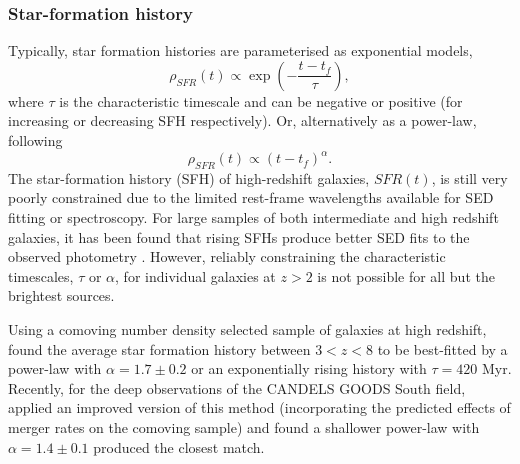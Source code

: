 \subsubsection{Star-formation history}
Typically, star formation histories are parameterised as exponential models,
\begin{equation}
    \rho_{SFR}(t) \propto \exp(-\frac{t - t_{f}}{\tau}),
\end{equation}
where $\tau$ is the characteristic timescale and can be negative or positive (for increasing or decreasing SFH respectively). Or, alternatively as a power-law, following
\begin{equation}
    \rho_{SFR}(t) \propto ({t - t_{f}})^{\alpha}.
\end{equation}
The star-formation history (SFH) of high-redshift galaxies, $SFR(t)$, is still very poorly constrained due to the limited rest-frame wavelengths available for SED fitting or spectroscopy. For large samples of both intermediate and high redshift galaxies, it has been found that rising SFHs produce better SED fits to the observed photometry \citep{Maraston:2010dl,Lee:2014in}. However, reliably constraining the characteristic timescales, $\tau$ or $\alpha$, for individual galaxies at $z > 2$ is not possible for all but the brightest sources.

Using a comoving number density selected sample of galaxies at high redshift, \citet{2011MNRAS.412.1123P} found the average star formation history between $3 < z < 8$ to be best-fitted by a power-law with $\alpha = 1.7 \pm 0.2$ or an exponentially rising history with $\tau = 420$ Myr. Recently, for the deep observations of the CANDELS GOODS South field, \citet{Salmon:2014tm} applied an improved version of this method (incorporating the predicted effects of merger rates on the comoving sample) and found a shallower power-law with $\alpha = 1.4 \pm 0.1$ produced the closest match.

